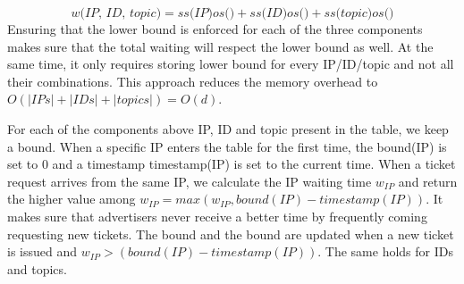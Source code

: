 \begin{equation}
    \textit{w(IP, ID, topic)} = 
    \textit{ss(IP)}\textit{os()} + 
    \textit{ss(ID)}\textit{os()} + 
    \textit{ss(topic)}\textit{os()}
\end{equation}
Ensuring that the lower bound is enforced for each of the three components makes sure that the total waiting will respect the lower bound as well. At the same time, it only requires storing lower bound for every IP/ID/topic and not all their combinations. This approach reduces the memory overhead to $O(|IPs|+|IDs|+|topics|) = O(d)$.

For each of the components above IP, ID and topic present in the table, we keep a bound. When a specific IP enters the table for the first time, the bound(IP) is set to 0 and a timestamp timestamp(IP) is set to the current time. When a ticket request arrives from the same IP, we calculate the IP waiting time $w_{IP}$ and return the higher value among $w_{IP} = max(w_{IP}, bound(IP) - timestamp(IP))$. It makes sure that advertisers never receive a better time by frequently coming requesting new tickets. The bound and the bound are updated when a new ticket is issued and $w_{IP} > (bound(IP) - timestamp(IP))$. The same holds for IDs and topics.


